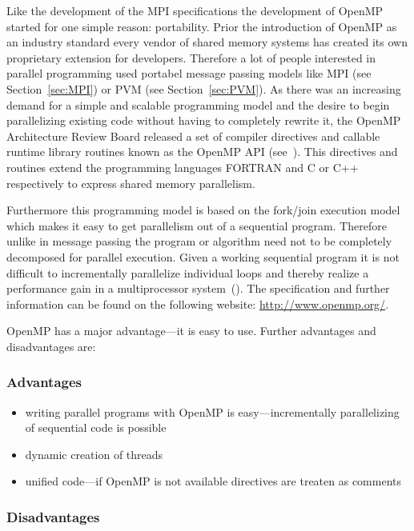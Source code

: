 Like the development of the MPI specifications the development
of OpenMP started for one simple reason: portability. Prior the
introduction of OpenMP as an industry standard every vendor of shared
memory systems has created its own proprietary extension for
developers. Therefore a lot of people interested in parallel
programming used portabel message passing models like MPI (see
Section~\ref{sec:MPI}) or PVM (see Section~\ref{sec:PVM}). As there
was an increasing demand for a simple and scalable programming model and
the desire to begin parallelizing existing code without having to
completely rewrite it, the OpenMP Architecture Review Board released a
set of compiler directives and callable runtime library routines
known as the OpenMP API (see~\cite{openMP05}). This directives and
routines extend the
programming languages FORTRAN and C or C++ respectively to express
shared memory parallelism.

Furthermore this programming model is based on the fork/join execution
model which makes it easy to get parallelism out of a sequential
program. Therefore unlike in message passing the program or algorithm
need not to be completely decomposed for parallel execution. Given a
working sequential program it is not difficult to incrementally
parallelize individual loops and thereby realize a performance gain in
a multiprocessor system~(\cite{dagum1997opi}). The specification and
further information can be found on the following website:
\url{http://www.openmp.org/}.


OpenMP has a major advantage---it is easy to use. Further advantages
and disadvantages are:

\subsubsection{Advantages}

\begin{itemize}
\item writing parallel programs with OpenMP is easy---incrementally
  parallelizing of sequential code is possible
\item dynamic creation of threads
\item unified code---if OpenMP is not available directives are
  treaten as comments 
\end{itemize}

\subsubsection{Disadvantages}

